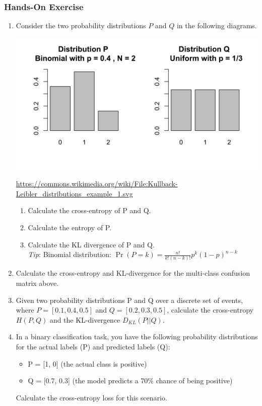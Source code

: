 \begin{tcolorbox}[colback=code]
\subsubsection*{Hands-On Exercise}

\begin{enumerate}
\item Consider the two probability distributions $P$ and $Q$ in the following diagrams. \begin{center}
\includegraphics[width=.5\textwidth]{kl.png}

\tiny \url{https://commons.wikimedia.org/wiki/File:Kullback-Leibler_distributions_example_1.svg}
\normalsize
\end{center}

\begin{enumerate}
   \item Calculate the cross-entropy of P and Q.
   \item Calculate the entropy of P.
   \item Calculate the KL divergence of P and Q. \\
   \vspace{-8mm}
\emph{Tip}: Binomial distribution: $\Pr(P=k) = \frac{n!}{k!(n-k)!} p^k (1-p)^{n-k}$ \\
\end{enumerate}

\vspace{1.5\baselineskip}
  \item Calculate the cross-entropy and KL-divergence for the multi-class confusion matrix above.
  \vspace{.5\baselineskip}
  \item Given two probability distributions P and Q over a discrete set of events, where $P = [0.1, 0.4, 0.5]$ and $Q = [0.2, 0.3, 0.5]$, calculate the cross-entropy $H(P, Q)$ and the KL-divergence $D_{KL}(P || Q)$.
  \vspace{.5\baselineskip}
  \item In a binary classification task, you have the following probability distributions for the actual labels (P) and predicted labels (Q):
\begin{itemize}
  \item P = [1, 0] (the actual class is positive)
  \item Q = [0.7, 0.3] (the model predicts a 70\% chance of being positive)
\end{itemize}
Calculate the cross-entropy loss for this scenario.


\end{enumerate}
\end{tcolorbox}
